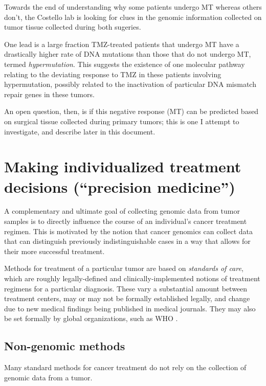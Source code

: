        Towards the end of understanding why some patients undergo MT
       whereas others don't, the Costello lab is looking for clues in
       the genomic information collected on tumor tissue collected
       during both sugeries.

       One lead is a large fraction TMZ-treated patients that undergo MT 
       have a drastically higher rate of DNA mutations than those that
       do not undergo MT, termed \textit{hypermutation}. This suggests
       the existence of one molecular pathway relating to the
       deviating response to TMZ in these patients involving
       hypermutation, possibly related to the inactivation of
       particular DNA mismatch repair genes in these tumors.

       An open question, then, is if this negative response (MT) can
       be predicted based on surgical tissue collected during primary
       tumors; this is one I attempt to investigate, and describe
       later in this document.

       \section{Making individualized treatment decisions (``precision
         medicine'')}

       A complementary and ultimate goal of collecting genomic data
       from tumor samples is to directly influence the course of an
       individual's cancer treatment regimen. This is motivated by the
       notion that cancer genomics can collect data that can
       distinguish previously indistinguishable cases in a way that
       allows for their more successful treatment.

    Methods for treatment of a particular tumor are based
       on \textit{standards of care}, which are roughly
       legally-defined and clinically-implemented notions of treatment
      regimens for a particular diagnosis. These vary a substantial
      amount between treatment centers, may or may not be formally
      established legally, and change due to new medical findings
      being published in medical journals. They may also be set
      formally by global organizations, such as WHO
      \cite{moffett_standard_2011}.       

       \subsection{Non-genomic methods}
      Many standard methods for cancer treatment do not rely on the
      collection of genomic data from a tumor.
      

